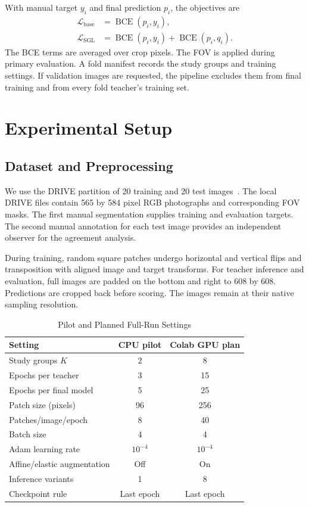 \documentclass[a4paper,conference]{IEEEtran}
\begin{document}
With manual target \(y_i\) and final prediction \(p_i\), the objectives are
\begin{align}
\mathcal{L}_{\mathrm{base}} &= \operatorname{BCE}(p_i,y_i),\\
\mathcal{L}_{\mathrm{SGL}} &= \operatorname{BCE}(p_i,y_i)
+ \operatorname{BCE}(p_i,q_i).
\end{align}
The BCE terms are averaged over crop pixels. The FOV is applied during primary evaluation. A fold manifest records the study groups and training settings. If validation images are requested, the pipeline excludes them from final training and from every fold teacher's training set.

\section{Experimental Setup}
\subsection{Dataset and Preprocessing}
We use the DRIVE partition of 20 training and 20 test images~\cite{staal}. The local DRIVE files contain 565 by 584 pixel RGB photographs and corresponding FOV masks. The first manual segmentation supplies training and evaluation targets. The second manual annotation for each test image provides an independent observer for the agreement analysis.

During training, random square patches undergo horizontal and vertical flips and transposition with aligned image and target transforms. For teacher inference and evaluation, full images are padded on the bottom and right to 608 by 608. Predictions are cropped back before scoring. The images remain at their native sampling resolution.

\begin{table}[!t]
\caption{Pilot and Planned Full-Run Settings}
\label{tab:config}
\centering\footnotesize
\begin{tabular}{@{}lcc@{}}
\toprule
Setting & CPU pilot & Colab GPU plan \\
\midrule
Study groups \(K\) & 2 & 8 \\
Epochs per teacher & 3 & 15 \\
Epochs per final model & 5 & 25 \\
Patch size (pixels) & 96 & 256 \\
Patches/image/epoch & 8 & 40 \\
Batch size & 4 & 4 \\
Adam learning rate & \(10^{-4}\) & \(10^{-4}\) \\
Affine/elastic augmentation & Off & On \\
Inference variants & 1 & 8 \\
Checkpoint rule & Last epoch & Last epoch \\
\bottomrule
\end{tabular}
\end{table}
\end{document}
